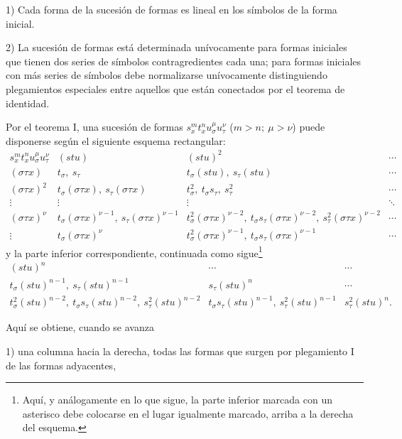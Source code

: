 \documentclass[11pt]{article}
\begin{document}
1) Cada forma de la sucesión de formas es lineal en los símbolos de la forma inicial.

2) La sucesión de formas está determinada unívocamente para formas iniciales que tienen dos series de símbolos contragredientes cada una; para formas iniciales con más series de símbolos debe normalizarse unívocamente distinguiendo plegamientos especiales entre aquellos que están conectados por el teorema de identidad.

Por el teorema I, una sucesión de formas $s_x^m t_x^n u_\sigma^\mu u_\tau^\nu$ ($m>n;\ \mu>\nu$) puede disponerse según el siguiente esquema rectangular:
\begingroup\small
\[
\begin{array}{c|c|c|c}
s_x^m t_x^n u_\sigma^\mu u_\tau^\nu
& (stu)
& (stu)^2
& \cdots\\[0.3em]
(\sigma\tau x)
& t_\sigma,\ s_\tau
& t_\sigma(stu),\ s_\tau(stu)
& \cdots\\[0.3em]
(\sigma\tau x)^2
& t_\sigma(\sigma\tau x),\ s_\tau(\sigma\tau x)
& t_\sigma^2,\ t_\sigma s_\tau,\ s_\tau^2
& \cdots\\[0.3em]
\vdots&\vdots&\vdots&\ddots\\[0.3em]
(\sigma\tau x)^\nu
& t_\sigma(\sigma\tau x)^{\nu-1},\ s_\tau(\sigma\tau x)^{\nu-1}
& t_\sigma^2(\sigma\tau x)^{\nu-2},\ t_\sigma s_\tau(\sigma\tau x)^{\nu-2},\ s_\tau^2(\sigma\tau x)^{\nu-2}
& \cdots\\[0.3em]
\vdots
& t_\sigma(\sigma\tau x)^\nu
& t_\sigma^2(\sigma\tau x)^{\nu-1},\ t_\sigma s_\tau(\sigma\tau x)^{\nu-1}
& \cdots
\end{array}
\]
\endgroup
y la parte inferior correspondiente, continuada como sigue\footnote{Aquí, y análogamente en lo que sigue, la parte inferior marcada con un asterisco debe colocarse en el lugar igualmente marcado, arriba a la derecha del esquema.}
\begingroup\small
\[
\begin{array}{c|c|c}
(stu)^n & \cdots & \cdots\\[0.3em]
t_\sigma(stu)^{n-1},\ s_\tau(stu)^{n-1}
& s_\tau(stu)^n & \cdots\\[0.3em]
t_\sigma^2(stu)^{n-2},\ t_\sigma s_\tau(stu)^{n-2},\ s_\tau^2(stu)^{n-2}
& t_\sigma s_\tau(stu)^{n-1},\ s_\tau^2(stu)^{n-1}
& s_\tau^2(stu)^n .
\end{array}
\]
\endgroup

Aquí se obtiene, cuando se avanza

1) una columna hacia la derecha, todas las formas que surgen por plegamiento I de las formas adyacentes,
\end{document}
